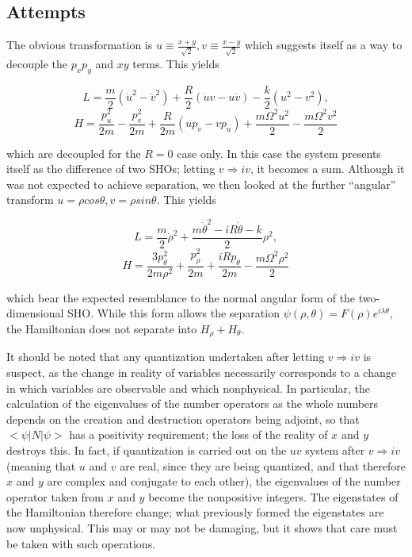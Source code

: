\subsection{Attempts}

The obvious transformation is
$u \equiv \frac{x + y}{\sqrt{2}}, v \equiv \frac{x - y}{\sqrt{2}}$
which suggests itself as a way to decouple the $p_{x}p_{y}$ and $xy$ terms.
This yields 

\begin{equation}
L = \frac{m}{2} (\dot{u}^2 - \dot{v}^2) + \frac{R}{2} (\dot{u} v - u \dot{v})
	- \frac{k}{2} (u^2 - v^2),
\end{equation}
\begin{equation}
H = \frac{p_{u}^2}{2 m} - \frac{p_{v}^2}{2 m} + 
	\frac{R}{2 m}(u p_{v} - v p_{u}) + \frac{m \Omega^2 u^2}{2} - 
	\frac{m \Omega^2 v^2}{2}
\end{equation}

which are decoupled for the $R = 0$ case only.  In this case the system 
presents itself as the difference of two SHOs; letting $v \Rightarrow i v$, 
it becomes a sum.
Although it was not expected to achieve separation, we then looked at the
further ``angular'' transform $u = \rho cos \theta, v = \rho sin \theta$.  
This yields

\begin{equation}
L = \frac{m}{2} \dot{\rho}^2 + \frac{m \dot{\theta}^2 - i R \dot{\theta}
	- k}{2} \rho^2,
\end{equation}
\begin{equation}
H = \frac{3 p_{\theta}^2}{2 m \rho^2} + \frac{p_{\rho}^2}{2 m} 
	+ \frac{i R p_{\theta}}{2 m} - \frac{m \Omega^2 \rho^2}{2}
\end{equation}

which bear the expected resemblance to the normal angular form of the
two-dimensional SHO.  While this form allows the separation $\psi(\rho, \theta)
= F(\rho) e^{i \lambda \theta}$, the Hamiltonian does not separate into 
$H_{\rho} + H_{\theta}$.

It should be noted that any quantization undertaken after letting 
$v \Rightarrow i v$ is suspect, as the change in reality of variables 
necessarily corresponds to a change in which variables are observable and
which nonphysical.  In particular, the calculation of the eigenvalues of
the number operators as the whole numbers depends on the creation and
destruction operators being adjoint, so that $<\psi| N |\psi>$ has a positivity
requirement; the loss of the reality of $x$ and $y$ destroys this.  In fact,
if quantization is carried out on the $uv$ system after $v \Rightarrow i v$
(meaning that $u$ and $v$ are real, since they are being quantized, and that
therefore $x$ and $y$ are complex and conjugate to each other), the 
eigenvalues of the number operator taken from $x$ and $y$ become the 
nonpositive integers.  The eigenstates of the Hamiltonian therefore change;
what previously formed the eigenstates are now unphysical.  This may or may
not be damaging, but it shows that care must be taken with such operations.

